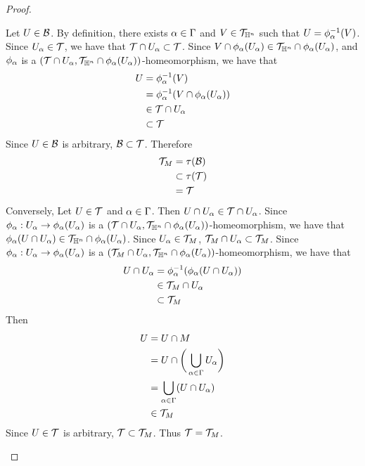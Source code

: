 \documentclass{book}
\begin{document}
\begin{proof}
\begin{enumerate}
			Let $U \in \mathcal{B}$. By definition, there exists $\alpha \in \Gamma$ and $V \in \mathcal{T}_{\mathbb{H}^n}$ such that $U = \phi_{\alpha}^{-1}(V)$. Since $U_{\alpha} \in \mathcal{T}$, we have that $\mathcal{T} \cap U_{\alpha} \subset \mathcal{T}$. Since $V \cap \phi_{\alpha}(U_{\alpha}) \in \mathcal{T}_{\mathbb{H}^n} \cap \phi_{\alpha}(U_{\alpha})$, and $\phi_{\alpha}$ is a  $(\mathcal{T} \cap U_{\alpha}, \mathcal{T}_{\mathbb{H}^n} \cap \phi_{\alpha}(U_{\alpha}))$-homeomorphism, we have that
			\begin{align*}
				U
				& = \phi_{\alpha}^{-1}(V) \\
				& = \phi_{\alpha}^{-1}(V \cap \phi_{\alpha}(U_{\alpha})) \\
				& \in \mathcal{T} \cap U_{\alpha} \\
				& \subset \mathcal{T} 
			\end{align*}
			Since $U \in \mathcal{B}$ is arbitrary, $\mathcal{B} \subset \mathcal{T}$. Therefore 
			\begin{align*}
				\mathcal{T}_M 
				& = \tau(\mathcal{B}) \\
				& \subset \tau(\mathcal{T}) \\
				& = \mathcal{T}
			\end{align*}
			Conversely, Let $U \in \mathcal{T}$ and $\alpha \in \Gamma$. Then $U \cap U_{\alpha} \in \mathcal{T} \cap U_{\alpha}$. Since $\phi_{\alpha}:U_{\alpha} \rightarrow \phi_{\alpha}(U_{\alpha})$ is a $(\mathcal{T} \cap U_{\alpha}, \mathcal{T}_{\mathbb{H}^n} \cap \phi_{\alpha}(U_{\alpha}))$-homeomorphism, we have that $\phi_{\alpha}(U \cap U_{\alpha}) \in \mathcal{T}_{\mathbb{H}^n} \cap \phi_{\alpha}(U_{\alpha})$. Since $U_{\alpha} \in \mathcal{T}_M$, $\mathcal{T}_M \cap U_{\alpha} \subset \mathcal{T}_M$. Since $\phi_{\alpha}:U_{\alpha} \rightarrow \phi_{\alpha}(U_{\alpha})$ is a $(\mathcal{T}_M \cap U_{\alpha}, \mathcal{T}_{\mathbb{H}^n} \cap \phi_{\alpha}(U_{\alpha}))$-homeomorphism, we have that 
			\begin{align*}
				U \cap U_{\alpha}
				& = \phi_{\alpha}^{-1}( \phi_{\alpha}(U \cap U_{\alpha})) \\
				& \in \mathcal{T}_M \cap U_{\alpha} \\
				& \subset \mathcal{T}_M 
			\end{align*}
			Then 
			\begin{align*}
				U
				& = U \cap M \\
				& = U \cap \bigg(\bigcup_{\alpha \in \Gamma} U_{\alpha} \bigg) \\
				& = \bigcup_{\alpha \in \Gamma} (U \cap U_{\alpha}) \\
				& \in \mathcal{T}_M 
			\end{align*}
			Since $U \in \mathcal{T}$ is arbitrary, $\mathcal{T} \subset \mathcal{T}_M$. Thus $\mathcal{T} = \mathcal{T}_M$.
		\end{enumerate}
	\end{proof}
	
\end{document}
